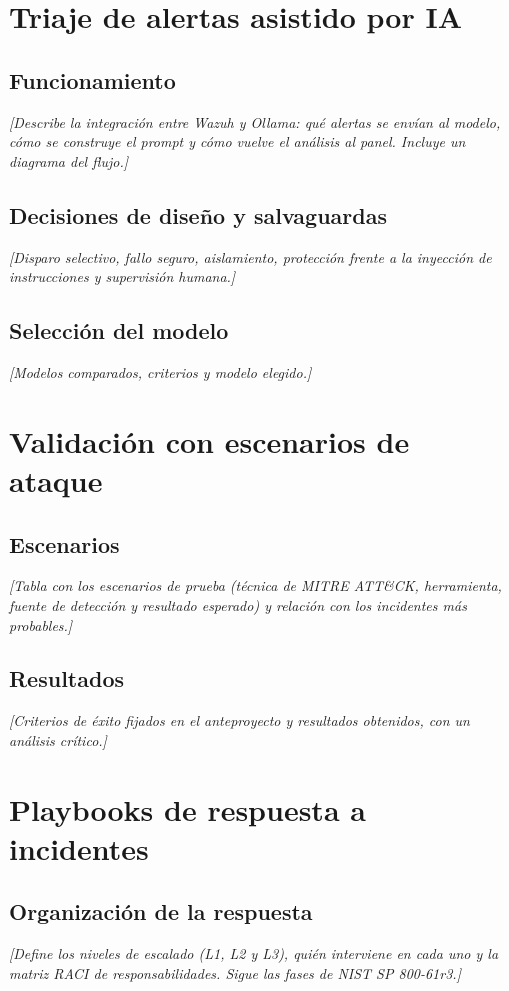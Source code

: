 \documentclass[11pt,a4paper,oneside]{report}
\newcommand{\guia}[1]{{\color{guia}\itshape[#1]}}
\begin{document}
\section{Triaje de alertas asistido por IA}
\subsection{Funcionamiento}
\guia{Describe la integración entre Wazuh y Ollama: qué alertas se envían al modelo, cómo se construye el prompt y cómo vuelve el análisis al panel. Incluye un diagrama del flujo.}
\subsection{Decisiones de diseño y salvaguardas}
\guia{Disparo selectivo, fallo seguro, aislamiento, protección frente a la inyección de instrucciones y supervisión humana.}
\subsection{Selección del modelo}
\guia{Modelos comparados, criterios y modelo elegido.}

\section{Validación con escenarios de ataque}
\label{sec:validacion}
\subsection{Escenarios}
\guia{Tabla con los escenarios de prueba (técnica de MITRE ATT\&CK, herramienta, fuente de detección y resultado esperado) y relación con los incidentes más probables.}
\subsection{Resultados}
\guia{Criterios de éxito fijados en el anteproyecto y resultados obtenidos, con un análisis crítico.}

\section{Playbooks de respuesta a incidentes}
\subsection{Organización de la respuesta}
\guia{Define los niveles de escalado (L1, L2 y L3), quién interviene en cada uno y la matriz RACI de responsabilidades. Sigue las fases de NIST SP 800-61r3.}
\end{document}
